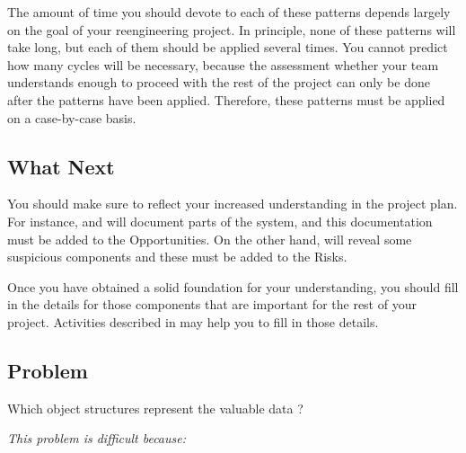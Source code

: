 \documentclass[a4paper,10pt,twoside]{book}
\begin{document}
The amount of time you should devote to each of these patterns depends largely on the goal 
of your reengineering project. In principle, none of these patterns will take long, but 
each of them should be applied several times. You cannot predict how many cycles will be 
necessary, because the assessment whether your team understands enough to proceed with the 
rest of the project can only be done after the patterns have been applied. Therefore, these 
patterns must be applied on a case-by-case basis.

\subsection*{What Next}

You should make sure to reflect your increased understanding in the project plan. For 
instance,  and 
 will document parts of the system, 
and this documentation must be added to the Opportunities. On the other hand,  will reveal some suspicious 
components and these must be added to the Risks.

Once you have obtained a solid foundation for your understanding, you should fill in the 
details for those components that are important for the rest of your project. Activities 
described in  may help you to fill 
in those details.



\subsection*{Problem}

Which object structures represent the valuable data ?

\emph{This problem is difficult because:}
\end{document}
